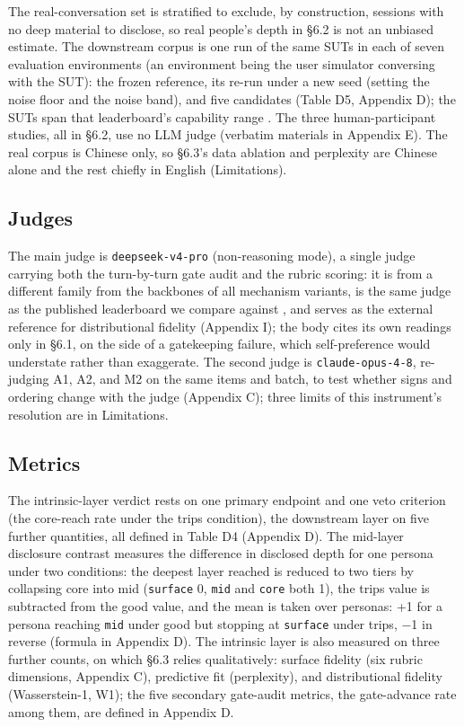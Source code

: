 \documentclass[letterpaper]{article}
\begin{document}
The real-conversation set is stratified to exclude, by construction, sessions with no deep material to disclose, so real people's depth in \S{}6.2 is not an unbiased estimate. The downstream corpus is one run of the same SUTs in each of seven evaluation environments (an environment being the user simulator conversing with the SUT): the frozen reference, its re-run under a new seed (setting the noise floor and the noise band), and five candidates (Table D5, Appendix D); the SUTs span that leaderboard's capability range \citep{companionbench}. The three human-participant studies, all in \S{}6.2, use no LLM judge (verbatim materials in Appendix E). The real corpus is Chinese only, so \S{}6.3's data ablation and perplexity are Chinese alone and the rest chiefly in English (Limitations).


\subsection{Judges}

The main judge is \texttt{deepseek-v4-pro} (non-reasoning mode), a single judge carrying both the turn-by-turn gate audit and the rubric scoring: it is from a different family from the backbones of all mechanism variants, is the same judge as the published leaderboard we compare against \citep{companionbench}, and serves as the external reference for distributional fidelity (Appendix I); the body cites its own readings only in \S{}6.1, on the side of a gatekeeping failure, which self-preference \citep{playfavorites} would understate rather than exaggerate. The second judge is \texttt{claude-opus-4-8}, re-judging A1, A2, and M2 on the same items and batch, to test whether signs and ordering change with the judge (Appendix C); three limits of this instrument's resolution are in Limitations.


\subsection{Metrics}

The intrinsic-layer verdict rests on one primary endpoint and one veto criterion (the core-reach rate under the trips condition), the downstream layer on five further quantities, all defined in Table D4 (Appendix D). The mid-layer disclosure contrast measures the difference in disclosed depth for one persona under two conditions: the deepest layer reached is reduced to two tiers by collapsing core into mid (\texttt{surface} 0, \texttt{mid} and \texttt{core} both 1), the trips value is subtracted from the good value, and the mean is taken over personas: +1 for a persona reaching \texttt{mid} under good but stopping at \texttt{surface} under trips, $-$1 in reverse (formula in Appendix D). The intrinsic layer is also measured on three further counts, on which \S{}6.3 relies qualitatively: surface fidelity (six rubric dimensions, Appendix C), predictive fit (perplexity), and distributional fidelity (Wasserstein-1, W1); the five secondary gate-audit metrics, the gate-advance rate among them, are defined in Appendix D.
\end{document}
